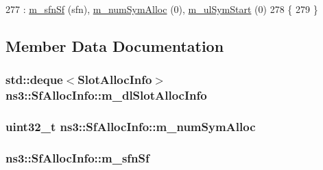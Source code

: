 \begin{DoxyCode}
277                                 : \hyperlink{structns3_1_1SfAllocInfo_a94ce81441772a4663db2051e7fb3e7d7}{m\_sfnSf} (sfn), \hyperlink{structns3_1_1SfAllocInfo_a829b7a82e5869efc3f5ac7643006075e}{m\_numSymAlloc} (0), 
      \hyperlink{structns3_1_1SfAllocInfo_afdc93045f3d8e17f1281e3aeae52e4cf}{m\_ulSymStart} (0)
278         \{
279         \}
\end{DoxyCode}


\subsection{Member Data Documentation}
\subsubsection[{\texorpdfstring{m\+\_\+dl\+Slot\+Alloc\+Info}{m_dlSlotAllocInfo}}]{\setlength{\rightskip}{0pt plus 5cm}std\+::deque$<${\bf Slot\+Alloc\+Info}$>$ ns3\+::\+Sf\+Alloc\+Info\+::m\+\_\+dl\+Slot\+Alloc\+Info}\hypertarget{structns3_1_1SfAllocInfo_ad2ab2d9f0082242c53439c6355607c70}{}\label{structns3_1_1SfAllocInfo_ad2ab2d9f0082242c53439c6355607c70}
\subsubsection[{\texorpdfstring{m\+\_\+num\+Sym\+Alloc}{m_numSymAlloc}}]{\setlength{\rightskip}{0pt plus 5cm}uint32\+\_\+t ns3\+::\+Sf\+Alloc\+Info\+::m\+\_\+num\+Sym\+Alloc}\hypertarget{structns3_1_1SfAllocInfo_a829b7a82e5869efc3f5ac7643006075e}{}\label{structns3_1_1SfAllocInfo_a829b7a82e5869efc3f5ac7643006075e}
\subsubsection[{\texorpdfstring{m\+\_\+sfn\+Sf}{m_sfnSf}}]{ ns3\+::\+Sf\+Alloc\+Info\+::m\+\_\+sfn\+Sf}\hypertarget{structns3_1_1SfAllocInfo_a94ce81441772a4663db2051e7fb3e7d7}{}\label{structns3_1_1SfAllocInfo_a94ce81441772a4663db2051e7fb3e7d7}

